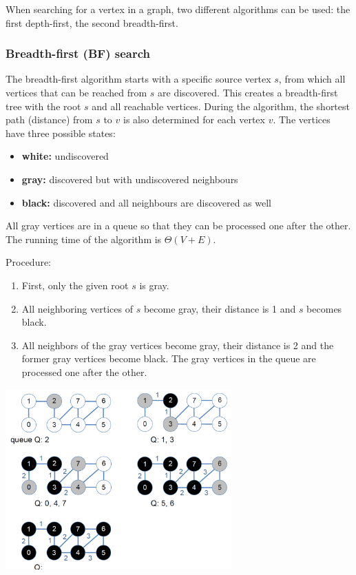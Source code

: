 When searching for a vertex in a graph, two different algorithms can be used: the first depth-first, the second breadth-first.

\subsubsection{Breadth-first (BF) search}

The breadth-first algorithm starts with a specific source vertex $s$, from which all vertices that can be reached from $s$ are discovered. This creates a breadth-first tree with the root $s$ and all reachable vertices.  During the algorithm, the shortest path (distance) from $s$ to $v$ is also determined for each vertex $v$. The vertices have three possible states:

\begin{itemize}
    \item \textbf{white:} undiscovered
    \item \textbf{gray:} discovered but with undiscovered neighbours
    \item \textbf{black:} discovered and all neighbours are discovered as well
\end{itemize}

All gray vertices are in a queue so that they can be processed one after the other. The running time of the algorithm is $\Theta(V+E)$.

Procedure:
\begin{enumerate}
    \item First, only the given root $s$ is gray.
    \item All neighboring vertices of $s$ become gray, their distance is 1 and $s$ becomes black.
    \item All neighbors of the gray vertices become gray, their distance is 2 and the former gray vertices become black. The gray vertices in the queue are processed one after the other.
\end{enumerate}

\begin{center}\includegraphics[width=0.65\textwidth]{img/graphs/BfSearch.png}\end{center}

